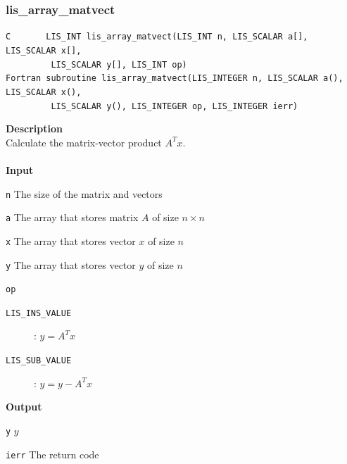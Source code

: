 \documentclass[a4paper]{article}
\newcommand{\namelistlabel}[1]{\mbox{#1}\hfill}
\newenvironment{namelist}[1]{%
\begin{list}{}
  {\let\makelabel\namelistlabel
  \settowidth{\labelwidth}{#1}
  \setlength{\leftmargin}{1.1\labelwidth}}
  }{%
\end{list}}
\begin{document}
\subsubsection{lis\_array\_matvect}
\begin{screen}
\verb|C       LIS_INT lis_array_matvect(LIS_INT n, LIS_SCALAR a[], LIS_SCALAR x[],|\\
\verb|         LIS_SCALAR y[], LIS_INT op)|\\
\verb|Fortran subroutine lis_array_matvect(LIS_INTEGER n, LIS_SCALAR a(), LIS_SCALAR x(),|\\
\verb|         LIS_SCALAR y(), LIS_INTEGER op, LIS_INTEGER ierr)|
\end{screen}
{\bf Description}\\
\indent
Calculate the matrix-vector product $A^{T}x$.
\\ \\
\noindent
{\bf Input}
\begin{namelist}{XXXXXXXXXXXXXXXXXXXX}
\item[\tt n] The size of the matrix and vectors  
\item[\tt a] The array that stores matrix $A$ of size $n \times n$
\item[\tt x] The array that stores vector $x$ of size $n$
\item[\tt y] The array that stores vector $y$ of size $n$
\item[\tt op] \begin{description}
\item[\tt LIS\_INS\_VALUE]: $y = A^Tx$
\item[\tt LIS\_SUB\_VALUE]: $y = y - A^Tx$
\end{description}
\end{namelist}
{\bf Output}
\begin{namelist}{XXXXXXXXXXXXXXXXXXXX}
\item[\tt y] $y$
\item[\tt ierr] The return code
\end{namelist}

\newpage
\end{document}
